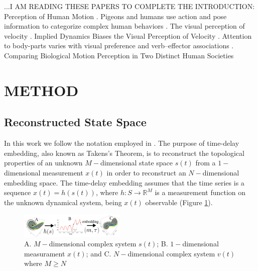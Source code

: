 \documentclass{sigchi}
\begin{document}
%
%





...I AM READING THESE PAPERS TO COMPLETE THE INTRODUCTION:
Perception of Human Motion \cite{Blake2007}.
Pigeons and humans use action and pose information to categorize complex human behaviors
\cite{Qadri201716}. The visual perception of velocity \cite{Brown1931}.
Implied Dynamics Biases the Visual Perception of Velocity \cite{LaScaleia2014}.
Attention to body-parts varies with visual preference and verb--effector associations \cite{Boyer2017}.
Comparing Biological Motion Perception in Two Distinct Human Societies \cite{Pica2011}


\section{METHOD}

\subsection{Reconstructed State Space}
In this work we follow the notation employed in \cite{Uzal2011}.
The purpose of time-delay embedding, also known as Takens's Theorem,
is to reconstruct the topological properties of an unknown $M-$dimensional
state space $s(t)$ from a $1-$dimensional measurement $x(t)$ in order to
reconstruct an $N-$dimensional embedding space.
The time-delay embedding assumes that the time series is a sequence $x(t)=h(s(t))$,
where $h: S \rightarrow \mathbb{R}^M$ is a measurement function on the unknown
dynamical system, being $x(t)$ observable (Figure \ref{fig:takens_theorem}).

\begin{figure}[!htb]
\centering
\includegraphics[width=0.45\textwidth]{figures/reconstructed_state_space/fig}
\caption[PA]{A. $M-$dimensional complex system $s(t)$; B. $1-$dimensional measurament
$x(t)$; and  C. $N-$dimensional complex system $v(t)$ where $M \geq N $}
\label{fig:takens_theorem}
\end{figure}
\end{document}
